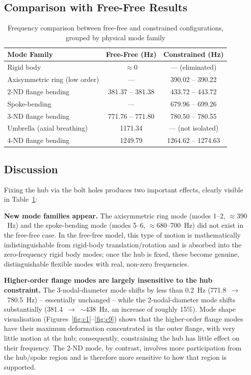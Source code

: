 \documentclass[11pt]{article}
\begin{document}
\subsection{Comparison with Free-Free Results}

\begin{table}[H]
\centering
\caption{Frequency comparison between free-free and constrained configurations, grouped
by physical mode family}
\label{tab:comparison}
\begin{tabular}{lcc}
\toprule
\textbf{Mode Family} & \textbf{Free-Free (Hz)} & \textbf{Constrained (Hz)} \\
\midrule
Rigid body                     & $\approx 0$        & --- (eliminated) \\
Axisymmetric ring (low order)  & ---                 & 390.02 -- 390.22 \\
2-ND flange bending            & 381.37 -- 381.38    & 433.72 -- 443.72 \\
Spoke-bending                  & ---                 & 679.96 -- 699.26 \\
3-ND flange bending            & 771.76 -- 771.80    & 780.50 -- 780.55 \\
Umbrella (axial breathing)     & 1171.34              & --- (not isolated) \\
4-ND flange bending            & 1249.79              & 1264.62 -- 1274.63 \\
\bottomrule
\end{tabular}
\end{table}

\subsection{Discussion}

Fixing the hub via the bolt holes produces two important effects, clearly visible in
Table~\ref{tab:comparison}:

\textbf{New mode families appear.} The axisymmetric ring mode (modes 1--2,
$\approx 390$~Hz) and the spoke-bending mode (modes 5--6, $\approx 680$--$700$~Hz)
did not exist in the free-free case. In the free-free model, this type of motion is
mathematically indistinguishable from rigid-body translation/rotation and is absorbed
into the zero-frequency rigid body modes; once the hub is fixed, these become genuine,
distinguishable flexible modes with real, non-zero frequencies.

\textbf{Higher-order flange modes are largely insensitive to the hub constraint.} The
3-nodal-diameter mode shifts by less than 0.2~Hz (771.8~$\rightarrow$~780.5~Hz) --
essentially unchanged -- while the 2-nodal-diameter mode shifts substantially
(381.4~$\rightarrow$~$\sim$438~Hz, an increase of roughly 15\%). Mode shape
visualisation (Figures~\ref{fig:c1}--\ref{fig:c9}) shows that the higher-order flange
modes have their maximum deformation concentrated in the outer flange, with very little
motion at the hub; consequently, constraining the hub has little effect on their
frequency. The 2-ND mode, by contrast, involves more participation from the hub/spoke
region and is therefore more sensitive to how that region is supported.
\end{document}
